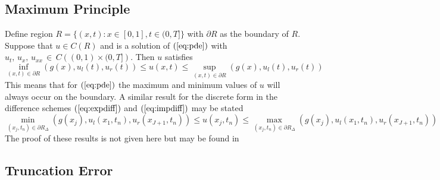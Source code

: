 \documentclass[11pt]{article}
\newcommand{\pl}{\partial}
\newcommand{\D}{\Delta}
\begin{document}
\subsection{Maximum Principle}
Define region $R = \{(x,t):x\in [0,1], t\in(0,T]\}$ with $\pl{R}$ as the boundary of $R$. Suppose that $u\in{C(R)}$ and is a solution of $(\ref{eq:pde})$
with $u_t,\,u_x,\,u_{xx}\, \in\,C\left((0,1)\times(0,T]\right)$. Then $u$ satisfies
\begin{equation}
\label{eq:maxpri}
\inf\limits_{(x,t) \in\pl{R}}\left(g(x),u_l(t),u_r(t)\right)   \leq u(x,t)\leq \sup\limits_{(x,t)\in\pl{R}}\left(g(x),u_l(t),u_r(t)\right)
\end{equation}
This means that for $(\ref{eq:pde})$ the maximum and minimum values of $u$ will always occur on the boundary. A similar result for the discrete form in the difference schemes $(\ref{eq:expdiff})$ and $(\ref{eq:impdiff})$ may be stated
\begin{equation}
\label{eq:dismaxpri}
\min\limits_{(x_j,t_n) \in\pl{R_{\D }}}\left(g(x_j),u_l(x_1,t_n),u_r(x_{J+1},t_n)\right)   \leq u(x_j,t_n)\leq \max\limits_{(x_j,t_n)\in\pl{R_{\D}}}\left(g(x_j),u_l(x_1,t_n),u_r(x_{J+1},t_n)\right)
\end{equation}
The proof of these results is not given here but may be found in \cite[p. 188-192]{Tveito1}
%
%
\subsection{Truncation Error}
\end{document}
